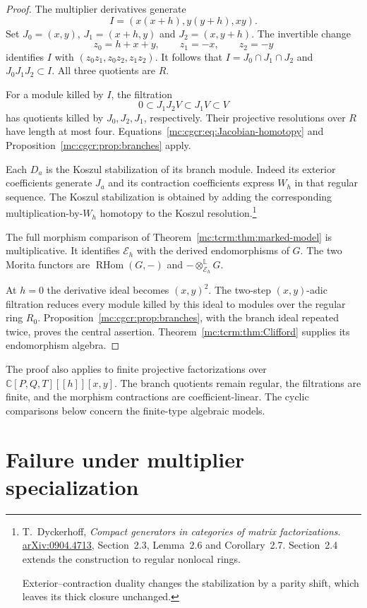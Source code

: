 \begin{proof}
The multiplier derivatives generate
\[
 I=(x(x+h),y(y+h),xy).
\]
Set $J_0=(x,y)$, $J_1=(x+h,y)$ and $J_2=(x,y+h)$.
The invertible change
\[
 z_0=h+x+y,\qquad z_1=-x,\qquad z_2=-y
\]
identifies $I$ with $(z_0z_1,z_0z_2,z_1z_2)$.
It follows that $I=J_0\cap J_1\cap J_2$ and
$J_0J_1J_2\subset I$. All three quotients are $R$.

For a module killed by $I$, the filtration
\[
 0\subset J_1J_2V\subset J_1V\subset V
\]
has quotients killed by $J_0,J_2,J_1$, respectively.
Their projective resolutions over $R$ have length at most
four. Equations~\eqref{mc:cgcr:eq:Jacobian-homotopy} and
Proposition~\ref{mc:cgcr:prop:branches} apply.

Each $D_a$ is the Koszul stabilization of its branch
module. Indeed its exterior coefficients generate $J_a$
and its contraction coefficients express $W_h$ in that
regular sequence. The Koszul stabilization is obtained
by adding the corresponding multiplication-by-$W_h$
homotopy to the Koszul resolution.\footnote{
T.~Dyckerhoff, \emph{Compact generators in categories of
matrix factorizations}.
\href{https://arxiv.org/abs/0904.4713}{arXiv:0904.4713},
Section~2.3, Lemma~2.6 and Corollary~2.7. Section~2.4
extends the construction to regular nonlocal rings.

Exterior--contraction duality changes the stabilization
by a parity shift, which leaves its thick closure unchanged.}

The full morphism comparison of
Theorem~\ref{mc:tcrm:thm:marked-model} is multiplicative.
It identifies $\mathcal E_h$ with the derived endomorphisms
of $G$. The two Morita functors are
$\operatorname{RHom}(G,-)$ and
$-\otimes^{\mathbb L}_{\mathcal E_h}G$.

At $h=0$ the derivative ideal becomes $(x,y)^2$.
The two-step $(x,y)$-adic filtration reduces every module
killed by this ideal to modules over the regular ring
$R_0$. Proposition~\ref{mc:cgcr:prop:branches}, with the branch
ideal repeated twice, proves the central assertion.
Theorem~\ref{mc:tcrm:thm:Clifford} supplies its endomorphism
algebra.
\end{proof}

The proof also applies to finite projective factorizations
over $\mathbb C[P,Q,T][[h]][x,y]$.
The branch quotients remain regular, the filtrations are
finite, and the morphism contractions are coefficient-linear.
The cyclic comparisons
below concern the finite-type algebraic models.

\section{Failure under multiplier specialization}

